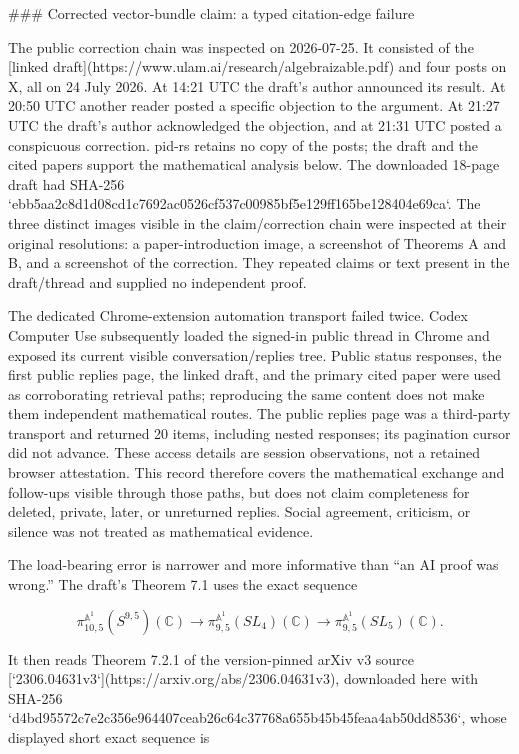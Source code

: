 \documentclass[11pt]{article}
\begin{document}
\begin{markdown}
### Corrected vector-bundle claim: a typed citation-edge failure

The public correction chain was inspected on 2026-07-25. It consisted of the
[linked draft](https://www.ulam.ai/research/algebraizable.pdf) and four posts on X, all on 24 July
2026. At 14:21 UTC the draft's author announced its result. At 20:50 UTC another reader posted a
specific objection to the argument. At 21:27 UTC the draft's author acknowledged the objection, and
at 21:31 UTC posted a conspicuous correction. pid-rs retains no copy of the posts; the draft and
the cited papers support the mathematical analysis below. The downloaded 18-page draft had SHA-256
`ebb5aa2c8d1d08cd1c7692ac0526cf537c00985bf5e129ff165be128404e69ca`. The three distinct images
visible in the claim/correction chain were inspected at their original resolutions: a
paper-introduction image, a screenshot of Theorems A and B, and a screenshot of the correction.
They repeated claims or text present in the draft/thread and supplied no independent proof.

The dedicated Chrome-extension automation transport failed twice. Codex Computer Use subsequently
loaded the signed-in public thread in Chrome and exposed its current visible conversation/replies
tree. Public status responses, the first public replies page, the linked draft, and the primary
cited paper were used as corroborating retrieval paths; reproducing the same content does not make
them independent mathematical routes. The public replies page was a third-party transport and
returned 20 items, including nested responses; its pagination cursor did not advance. These access
details are session observations, not a retained browser attestation. This record therefore covers
the mathematical exchange and follow-ups visible through those paths, but does not claim
completeness for deleted, private, later, or unreturned replies. Social agreement, criticism, or
silence was not treated as mathematical evidence.

The load-bearing error is narrower and more informative than “an AI proof was wrong.” The draft's
Theorem 7.1 uses the exact sequence

$$
 \pi^{\mathbb A^1}_{10,5}(S^{9,5})(\mathbb C)
 \longrightarrow \pi^{\mathbb A^1}_{9,5}(SL_4)(\mathbb C)
 \longrightarrow \pi^{\mathbb A^1}_{9,5}(SL_5)(\mathbb C).
$$

It then reads Theorem 7.2.1 of the version-pinned arXiv v3 source
[`2306.04631v3`](https://arxiv.org/abs/2306.04631v3), downloaded here with SHA-256
`d4bd95572c7e2c356e964407ceab26c64c37768a655b45b45feaa4ab50dd8536`, whose displayed short
exact sequence is


\end{markdown}
\end{document}
